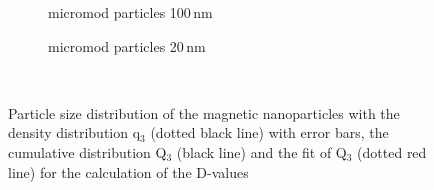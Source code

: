 \begin{figure}[h]
          \begin{subfigure}{0.49\textwidth}
                  \caption{micromod particles 100\,nm}\label{fig:hist_micro_100}
          \end{subfigure}\hfill
        \begin{subfigure}{0.49\textwidth}
                \caption{micromod particles 20\,nm}\label{fig:hist_micro_20}
        \end{subfigure}
        \\        
        \caption[Volumetric particle size distribution of the magnetic nanoparticles]{Particle size distribution of the magnetic nanoparticles with the density distribution q$_{3}$ (dotted black line) with error bars, the cumulative distribution Q$_{3}$ (black line) and the fit of Q$_{3}$ (dotted red line) for the calculation of the D-values}
        \label{fig:Hist_nano}
  \end{figure} 


